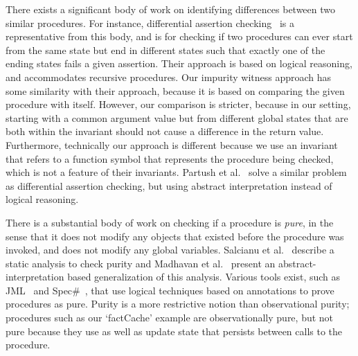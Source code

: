 There exists a significant body of work on identifying differences between
two similar procedures.  For instance, differential assertion
checking~\cite{lahiri2013differential} is a representative from this body,
and is for checking if two procedures can ever start from the same state
but end in different states such that exactly one of the ending states
fails a given assertion. Their
approach is based on logical reasoning, and accommodates recursive
procedures. Our impurity witness approach has some similarity with their
approach, because it is based on comparing the given procedure with
itself. However, our comparison is stricter, because in our setting,
starting with a common argument value but from different global states that
are both within the invariant should not cause a difference in the return
value. Furthermore, technically our approach is different because we use an
invariant that refers to a function symbol that represents the procedure
being checked, which is not a feature of their invariants. Partush et
al.~\cite{partush2013abstract} solve a similar problem as differential
assertion checking, but using abstract interpretation instead of logical
reasoning.

There is a substantial body of work on checking if a procedure is
\emph{pure}, in the sense that it does not
modify any objects that existed before the procedure was invoked, and does not
modify any  global variables. Salcianu et
al.~\cite{sualcianu2005purity} describe a static analysis to check purity
and Madhavan et al.~\cite{ravi:purity} present an abstract-interpretation
based generalization of this analysis.
Various tools exist, such as
JML~\cite{leavens2008jml} and Spec\#~\cite{barnett2004spec}, that use logical
techniques based on annotations to prove procedures as pure.  Purity is a
more restrictive notion than observational purity; procedures such
as our `factCache' example are observationally pure, but not pure because
they use as well as update state that persists between calls to the
procedure. 
